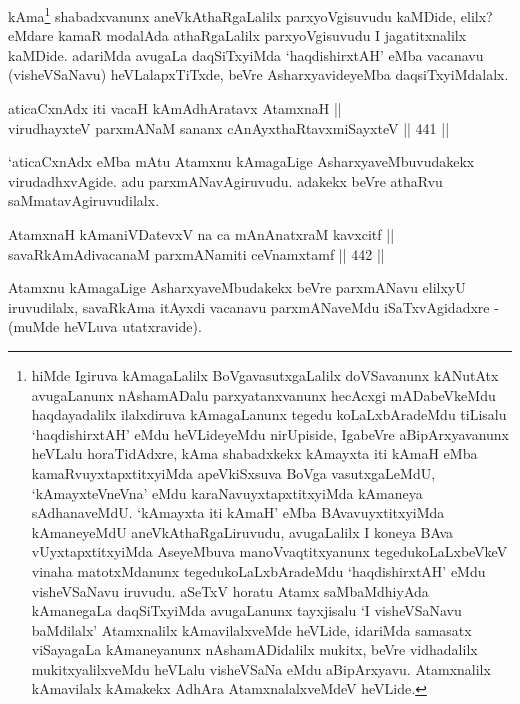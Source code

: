 \begin{artha}
kAma\footnote{hiMde Igiruva kAmagaLalilx BoVgavasutxgaLalilx doVSavanunx kANutAtx avugaLanunx nAshamADalu parxyatanxvanunx hecAcxgi mADabeVkeMdu haqdayadalilx ilalxdiruva kAmagaLanunx tegedu koLaLxbAradeMdu tiLisalu `haqdishirxtAH' eMdu heVLideyeMdu nirUpiside, IgabeVre aBipArxyavanunx heVLalu horaTidAdxre, kAma shabadxkekx kAmayxta iti kAmaH eMba kamaRvuyxtapxtitxyiMda apeVkiSxsuva BoVga vasutxgaLeMdU, `kAmayxteV\s neVna' eMdu karaNavuyxtapxtitxyiMda kAmaneya sAdhanaveMdU. `kAmayxta iti kAmaH' eMba BAvavuyxtitxyiMda kAmaneyeMdU aneVkAthaRgaLiruvudu, avugaLalilx I koneya BAva vUyxtapxtitxyiMda AseyeMbuva manoVvaqtitxyanunx tegedukoLaLxbeVkeV vinaha matotxMdanunx tegedukoLaLxbAradeMdu `haqdishirxtAH' eMdu visheVSaNavu iruvudu. aSeTxV horatu Atamx saMbaMdhiyAda kAmanegaLa daqSiTxyiMda avugaLanunx tayxjisalu `I visheVSaNavu baMdilalx' Atamxnalilx kAmavilalxveMde heVLide, idariMda samasatx viSayagaLa kAmaneyanunx nAshamADidalilx mukitx,  beVre vidhadalilx mukitxyalilxveMdu heVLalu visheVSaNa eMdu aBipArxyavu. Atamxnalilx kAmavilalx kAmakekx AdhAra AtamxnalalxveMdeV heVLide.} shabadxvanunx aneVkAthaRgaLalilx parxyoVgisuvudu kaMDide, elilx? eMdare kamaR modalAda athaRgaLalilx parxyoVgisuvudu I jagatitxnalilx kaMDide. adariMda avugaLa daqSiTxyiMda `haqdishirxtAH' eMba vacanavu (visheVSaNavu) heVLalapxTiTxde, beVre AsharxyavideyeMba daqsiTxyiMdalalx.
\end{artha}


\begin{shl}
aticaCxnAdx iti vacaH kAmAdhAratavx AtamxnaH || \\
virudhayxteV parxmANaM sananx cAnAyxthaRtavxmiSayxteV \hfill || 441 ||  
\end{shl}

\begin{artha}
`aticaCxnAdx eMba mAtu Atamxnu kAmagaLige AsharxyaveMbuvudakekx
virudadhxvAgide. adu parxmANavAgiruvudu. adakekx beVre athaRvu
saMmatavAgiruvudilalx.
\end{artha}

\begin{shl}
AtamxnaH kAmaniVDatevxV na ca mAnAnatxraM kavxcitf ||  \\
savaRkAmAdivacanaM parxmANamiti ceVnamxtamf \hfill || 442 ||  
\end{shl}

\begin{artha}
Atamxnu kAmagaLige AsharxyaveMbudakekx beVre parxmANavu elilxyU
iruvudilalx, savaRkAma itAyxdi vacanavu parxmANaveMdu iSaTxvAgidadxre
- (muMde heVLuva utatxravide).
\end{artha}


